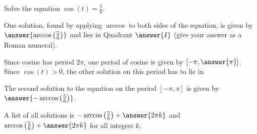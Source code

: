 \documentclass{ximera}
\author{Kenneth Berglund}
\begin{document}
\begin{exercise}
Solve the equation $\cos(t) = \frac{5}{6}$. 

One solution, found by applying $\arccos$ to both sides of the equation, is given by $\answer{\arccos\left(\frac{5}{6}\right)}$ and lies in Quadrant $\answer{I}$ (give your answer as a Roman numeral). 

\begin{exercise}
Since cosine has period $2\pi$, one period of cosine is given by $[-\pi, \answer{\pi}]$. Since $\cos(t) > 0$, the other solution on this period has to lie in
\begin{multipleChoice}
\end{multipleChoice} 
\begin{exercise}
The second solution to the equation on the period $[-\pi, \pi]$ is given by $\answer{-\arccos\left(\frac{5}{6}\right)}$. 

\begin{exercise}
A list of all solutions is $-\arccos\left(\frac{5}{6}\right) + \answer{2\pi k}$ and $\arccos\left(\frac{5}{6}\right) + \answer{2 \pi k}$ for all integers $k$. 
\end{exercise}
\end{exercise}
\end{exercise}
\end{exercise}
\end{document}
